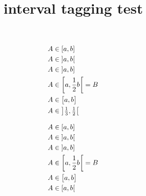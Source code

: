 \documentclass{article}
\title{interval tagging test}
\begin{document}
\begin{align*}
& A\in\interval{a}{b}              \\
& A\in\interval[open]{a}{b}        \\
& A\in\interval[open left]{a}{b}   \\      
& A\in\interval[open right,
  scaled]{a}{\frac{1}{2}b}=B       \\     
& A\in\interval[scaled=\big]{a}{b} \\
& A\in\ointerval[scaled]{%
  \tfrac{1}{3}}{\tfrac{1}{2}}
\end{align*}

\begin{align*}
& A\in\interval{a}{b}              \\
& A\in\interval[open]{a}{b}        \\
& A\in\interval[open left]{a}{b}   \\      
& A\in\interval[open right,
  scaled]{a}{\frac{1}{2}b}=B       \\     
& A\in\interval[scaled=\big]{a}{b} \\
& A\in\rinterval{a}{b}
\end{align*}
\end{document}
